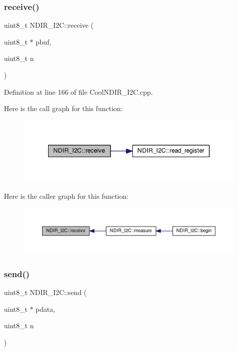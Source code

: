 \subsubsection{\texorpdfstring{receive()}{receive()}}
{\footnotesize\ttfamily uint8\+\_\+t N\+D\+I\+R\+\_\+\+I2\+C\+::receive (\begin{DoxyParamCaption}\item[{uint8\+\_\+t $\ast$}]{pbuf,  }\item[{uint8\+\_\+t}]{n }\end{DoxyParamCaption})\hspace{0.3cm}{\ttfamily [private]}}



Definition at line 166 of file Cool\+N\+D\+I\+R\+\_\+\+I2\+C.\+cpp.

Here is the call graph for this function\+:\nopagebreak
\begin{figure}[H]
\begin{center}
\leavevmode
\includegraphics[width=342pt]{class_n_d_i_r___i2_c_aa6d2b8dd287f9c9015461cebb18f9abc_cgraph}
\end{center}
\end{figure}
Here is the caller graph for this function\+:\nopagebreak
\begin{figure}[H]
\begin{center}
\leavevmode
\includegraphics[width=350pt]{class_n_d_i_r___i2_c_aa6d2b8dd287f9c9015461cebb18f9abc_icgraph}
\end{center}
\end{figure}
\mbox{\label{class_n_d_i_r___i2_c_aab0c04c2b7d08e99d12af044df179f0c}} 
\subsubsection{\texorpdfstring{send()}{send()}}
{\footnotesize\ttfamily uint8\+\_\+t N\+D\+I\+R\+\_\+\+I2\+C\+::send (\begin{DoxyParamCaption}\item[{uint8\+\_\+t $\ast$}]{pdata,  }\item[{uint8\+\_\+t}]{n }\end{DoxyParamCaption})\hspace{0.3cm}{\ttfamily [private]}}



